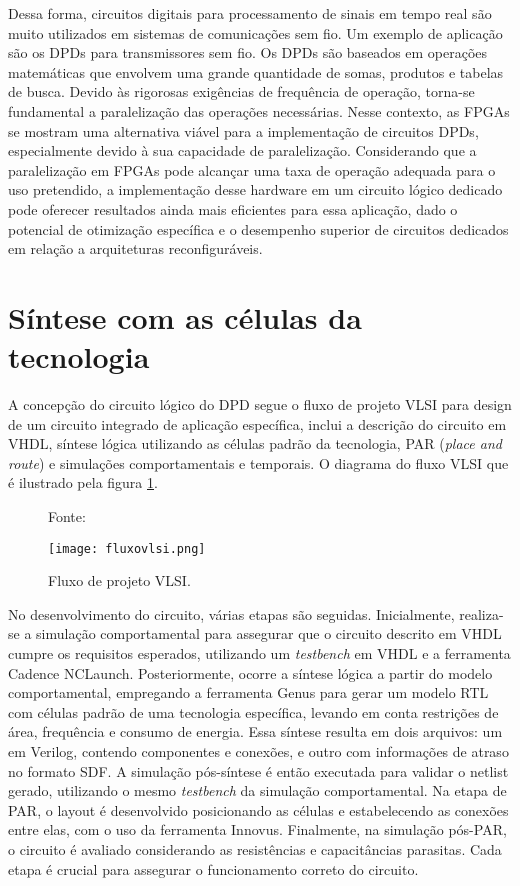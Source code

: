 Dessa forma, circuitos digitais para processamento de sinais em tempo real são muito utilizados em sistemas de comunicações sem fio. Um exemplo de aplicação são os DPDs para transmissores sem fio. Os DPDs são baseados em operações matemáticas que envolvem uma grande quantidade de somas, produtos e tabelas de busca. Devido às rigorosas exigências de frequência de operação, torna-se fundamental a paralelização das operações necessárias. Nesse contexto, as FPGAs se mostram uma alternativa viável para a implementação de circuitos DPDs, especialmente devido à sua capacidade de paralelização. Considerando que a paralelização em FPGAs pode alcançar uma taxa de operação adequada para o uso pretendido, a implementação desse hardware em um circuito lógico dedicado pode oferecer resultados ainda mais eficientes para essa aplicação, dado o potencial de otimização específica e o desempenho superior de circuitos dedicados em relação a arquiteturas reconfiguráveis.

\section{Síntese com as células da tecnologia}
A concepção do circuito lógico do DPD segue o fluxo de projeto VLSI para design de um circuito integrado de aplicação específica, inclui a descrição do circuito em VHDL, síntese lógica utilizando as células padrão da tecnologia, PAR (\textit{place and route}) e simulações comportamentais e temporais. O diagrama do fluxo VLSI que é ilustrado pela figura \ref{fig:CMOS2010}.

\begin{figure}[htbp!]
	\centering
	\captionsetup{justification=centering}
	\caption*{Fonte: \cite{CMOS2010}}
	\texttt{[image: fluxovlsi.png]}
	\caption{Fluxo de projeto VLSI.}
	\label{fig:CMOS2010}
\end{figure}

No desenvolvimento do circuito, várias etapas são seguidas. Inicialmente, realiza-se a simulação comportamental para assegurar que o circuito descrito em VHDL cumpre os requisitos esperados, utilizando um \textit{testbench} em VHDL e a ferramenta Cadence NCLaunch. Posteriormente, ocorre a síntese lógica a partir do modelo comportamental, empregando a ferramenta Genus para gerar um modelo RTL com células padrão de uma tecnologia específica, levando em conta restrições de área, frequência e consumo de energia. Essa síntese resulta em dois arquivos: um em Verilog, contendo componentes e conexões, e outro com informações de atraso no formato SDF. A simulação pós-síntese é então executada para validar o netlist gerado, utilizando o mesmo \textit{testbench} da simulação comportamental. Na etapa de PAR, o layout é desenvolvido posicionando as células e estabelecendo as conexões entre elas, com o uso da ferramenta Innovus. Finalmente, na simulação pós-PAR, o circuito é avaliado considerando as resistências e capacitâncias parasitas. Cada etapa é crucial para assegurar o funcionamento correto do circuito.

